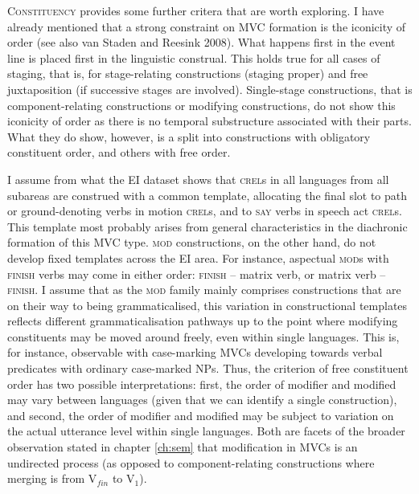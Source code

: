 \textsc{Constituency} provides some further critera that are worth exploring. I have already mentioned that a strong constraint on MVC formation is the iconicity of order (see also van Staden and Reesink 2008). What happens first in the event line is placed first in the linguistic construal. This holds true for all cases of staging, that is, for stage-relating constructions (staging proper) and free juxtaposition (if successive stages are involved). Single-stage constructions, that is component-relating constructions or modifying constructions, do not show this iconicity of order as there is no temporal substructure associated with their parts. What they do show, however, is a split into constructions with obligatory constituent order, and others with free order. 

I assume from what the EI dataset shows that \textsc{crel}s in all languages from all subareas are construed with a common template, allocating the final slot to path or ground-denoting verbs in motion \textsc{crel}s, and to \textsc{say} verbs in speech act \textsc{crel}s. This template most probably arises from general characteristics in the diachronic formation of this MVC type. \textsc{mod} constructions, on the other hand, do not develop fixed templates across the EI area. For instance, aspectual \textsc{mod}s with \textsc{finish} verbs may come in either order: \textsc{finish} -- matrix verb, or matrix verb -- \textsc{finish}. I assume that as the \textsc{mod} family mainly comprises constructions that are on their way to being grammaticalised, this variation in constructional templates reflects different grammaticalisation pathways up to the point where modifying constituents may be moved around freely, even within single languages. This is, for instance, observable with case-marking MVCs developing towards verbal predicates with ordinary case-marked NPs. Thus, the criterion of free constituent order has two possible interpretations: first, the order of modifier and modified may vary between languages (given that we can identify a single construction), and second, the order of modifier and modified may be subject to variation on the actual utterance level within single languages. Both are facets of the broader observation stated in chapter \ref{ch:sem} that modification in MVCs is an undirected process (as opposed to component-relating constructions where merging is from V$_{fin}$ to V$_1$).


